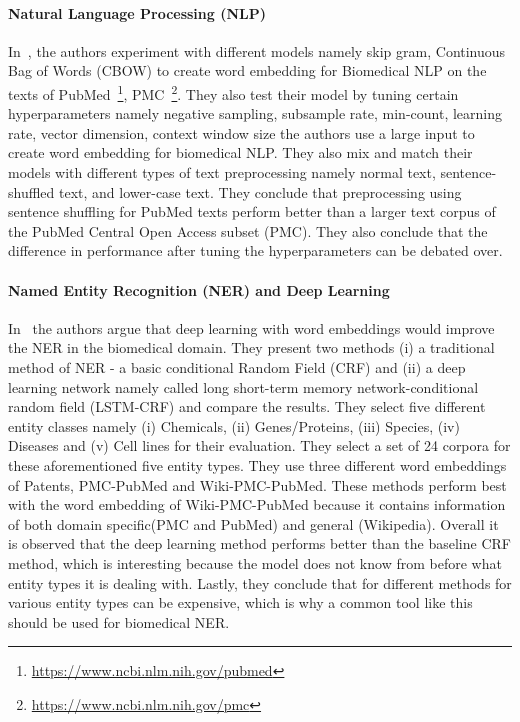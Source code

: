 \paragraph{Natural Language Processing (NLP)}
In~\cite{chiu2016train}, the authors experiment with different models namely skip gram, Continuous Bag of Words (CBOW)  to create word embedding for Biomedical NLP on the texts of PubMed~\footnote{\url{https://www.ncbi.nlm.nih.gov/pubmed}}, PMC~\footnote{\url{https://www.ncbi.nlm.nih.gov/pmc}}. They also test their model by tuning certain hyperparameters namely negative sampling, subsample rate, min-count, learning rate, vector dimension, context window size the authors use a large input to create word embedding for biomedical NLP. They also mix and match their models with different types of text preprocessing namely normal text, sentence-shuffled text, and lower-case text. They conclude that preprocessing using sentence shuffling for PubMed texts perform better than a larger text corpus of the PubMed Central Open Access subset (PMC). They also conclude that the difference in performance after tuning the hyperparameters can be debated over. 

\paragraph{Named Entity Recognition (NER) and Deep Learning}
In~\cite{habibi2017deep} the authors argue that deep learning with word embeddings would improve the NER in the biomedical domain. They present two methods (i) a traditional method of NER - a basic conditional Random Field (CRF) and (ii) a deep learning network namely called long short-term memory network-conditional random field (LSTM-CRF) and compare the results. They select five different entity classes namely (i) Chemicals, (ii) Genes/Proteins, (iii) Species, (iv) Diseases and (v) Cell lines for their evaluation. They select a set of 24 corpora for these aforementioned five entity types. They use three different word embeddings of Patents, PMC-PubMed and Wiki-PMC-PubMed. These methods perform best with the word embedding of Wiki-PMC-PubMed because it contains information of both domain specific(PMC and PubMed) and general (Wikipedia). Overall it is observed that the deep learning method performs better than the baseline CRF method, which is interesting because the model does not know from before what entity types it is dealing with. 
Lastly, they conclude that for different methods for various entity types can be expensive, which is why a common tool like this should be used for biomedical NER. 

